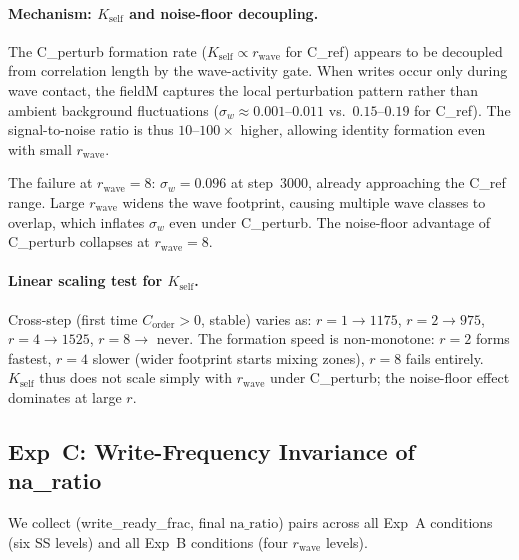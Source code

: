 \documentclass[11pt,a4paper]{article}
\newcommand{\Corder}{C_{\mathrm{order}}}
\newcommand{\sw}{\sigma_w}
\newcommand{\na}{\mathrm{na\_ratio}}
\begin{document}
\paragraph{Mechanism: $K_\mathrm{self}$ and noise-floor decoupling.}
The C\_perturb formation rate ($K_\mathrm{self} \propto r_\mathrm{wave}$ for C\_ref)
appears to be decoupled from correlation length by the wave-activity gate. When
writes occur only during wave contact, the fieldM captures the local perturbation
pattern rather than ambient background fluctuations ($\sw \approx 0.001$--$0.011$
vs.\ $0.15$--$0.19$ for C\_ref). The signal-to-noise ratio is thus $10$--$100\times$
higher, allowing identity formation even with small $r_\mathrm{wave}$.

The failure at $r_\mathrm{wave}=8$: $\sw=0.096$ at step~3000, already approaching
the C\_ref range. Large $r_\mathrm{wave}$ widens the wave footprint, causing multiple
wave classes to overlap, which inflates $\sw$ even under C\_perturb. The noise-floor
advantage of C\_perturb collapses at $r_\mathrm{wave}=8$.

\paragraph{Linear scaling test for $K_\mathrm{self}$.}
Cross-step (first time $\Corder>0$, stable) varies as: $r=1 \to 1175$, $r=2 \to 975$,
$r=4 \to 1525$, $r=8 \to$ never. The formation speed is non-monotone: $r=2$ forms
fastest, $r=4$ slower (wider footprint starts mixing zones), $r=8$ fails entirely.
$K_\mathrm{self}$ thus does not scale simply with $r_\mathrm{wave}$ under C\_perturb;
the noise-floor effect dominates at large $r$.

\subsection{Exp~C: Write-Frequency Invariance of na\_ratio}

We collect (write\_ready\_frac, final $\na$) pairs across all Exp~A conditions
(six SS levels) and all Exp~B conditions (four $r_\mathrm{wave}$ levels).
\end{document}

